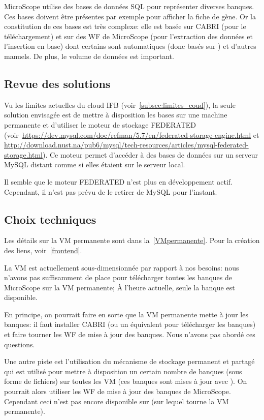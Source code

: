 MicroScope utilise des bases de données SQL pour représenter diverses banques.
Ces bases doivent être présentes par exemple pour afficher la fiche de gène.
Or la constitution de ces bases est très complexe:
elle est basée sur CABRI (pour le téléchargement)
et sur des WF de MicroScope (pour l'extraction des données et l'insertion en base)
dont certains sont automatiques (donc basés sur ) et d'autres manuels.
De plus, le volume de données est important.

\subsection{Revue des solutions}

Vu les limites actuelles du cloud IFB (voir~\autoref{subsec:limites_coud}),
la seule solution envisagée est de mettre à disposition les bases sur une machine permanente et
d'utiliser le moteur de stockage FEDERATED (voir~\url{https://dev.mysql.com/doc/refman/5.7/en/federated-storage-engine.html} et \url{http://download.nust.na/pub6/mysql/tech-resources/articles/mysql-federated-storage.html}).
Ce moteur permet d'accéder à des bases de données sur un serveur MySQL distant comme si elles étaient sur le serveur local.

\begin{warningbox}
    Il semble que le moteur FEDERATED n'est plus en développement actif.
    Cependant, il n'est pas prévu de le retirer de MySQL pour l'instant.
\end{warningbox}

\subsection{Choix techniques}

Les détails sur la VM permanente sont dans la~\autoref{VMpermanente}.
Pour la création des liens, voir~\autoref{frontend}.

La VM est actuellement sous-dimensionnée par rapport à nos besoins:
nous n'avons pas suffisamment de place pour télécharger toutes les banques de MicroScope sur la VM permanente;
À l'heure actuelle, seule la banque  est disponible.

En principe, on pourrait faire en sorte que la VM permanente mette à jour les banques:
il faut installer CABRI (ou un équivalent pour télécharger les banques) et faire tourner les WF de mise à jour des banques.
Nous n'avons pas abordé ces questions.

Une autre piste est l'utilisation du mécanisme de stockage permanent et partagé
qui est utilisé pour mettre à disposition un certain nombre de banques (sous forme de fichiers)
sur toutes les VM (ces banques sont mises à jour avec ).
On pourrait alors utiliser les WF de mise à jour des banques de MicroScope.
Cependant ceci n'est pas encore disponible sur  (sur lequel tourne la VM permanente).

